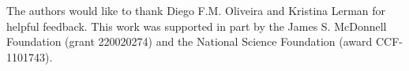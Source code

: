 The authors would like to thank Diego F.M. Oliveira and Kristina Lerman for helpful feedback. This work was supported in part by the James S. McDonnell Foundation  (grant 220020274) and the National Science Foundation (award CCF-1101743).
